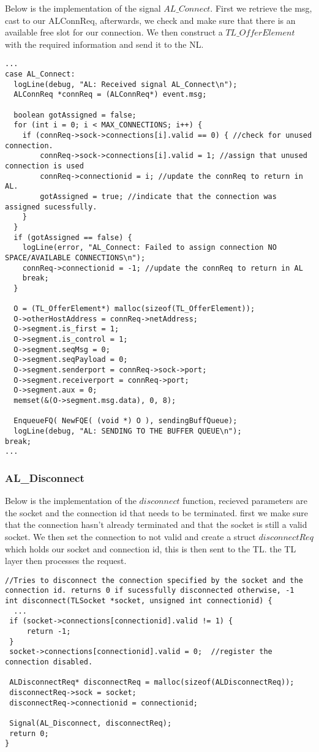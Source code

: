 Below is the implementation of the signal $AL\_Connect$.
First we retrieve the msg, cast to our ALConnReq, afterwards, we check and make sure that
there is an available free slot for our connection.
We then construct a $TL\_OfferElement$ with the required information and send it to the NL.
\begin{lstlisting}
...
case AL_Connect:
  logLine(debug, "AL: Received signal AL_Connect\n");
  ALConnReq *connReq = (ALConnReq*) event.msg;

  boolean gotAssigned = false;
  for (int i = 0; i < MAX_CONNECTIONS; i++) {
    if (connReq->sock->connections[i].valid == 0) { //check for unused connection.
        connReq->sock->connections[i].valid = 1; //assign that unused connection is used
        connReq->connectionid = i; //update the connReq to return in AL.
        gotAssigned = true; //indicate that the connection was assigned sucessfully.
    }
  }
  if (gotAssigned == false) {
    logLine(error, "AL_Connect: Failed to assign connection NO SPACE/AVAILABLE CONNECTIONS\n");
    connReq->connectionid = -1; //update the connReq to return in AL
    break;
  }

  O = (TL_OfferElement*) malloc(sizeof(TL_OfferElement));
  O->otherHostAddress = connReq->netAddress;
  O->segment.is_first = 1;
  O->segment.is_control = 1;
  O->segment.seqMsg = 0;
  O->segment.seqPayload = 0;
  O->segment.senderport = connReq->sock->port;
  O->segment.receiverport = connReq->port;
  O->segment.aux = 0;
  memset(&(O->segment.msg.data), 0, 8);

  EnqueueFQ( NewFQE( (void *) O ), sendingBuffQueue);
  logLine(debug, "AL: SENDING TO THE BUFFER QUEUE\n");
break;
...
\end{lstlisting}



\subsubsection{AL\_Disconnect}

Below is the implementation of the $disconnect$ function, recieved parameters are the socket and the connection id that needs to be terminated.
first we make sure that the connection hasn't already terminated and that the socket is still a valid socket.
We then set the connection to not valid and create a struct $disconnectReq$ which holds our socket and connection id, this is then sent to the TL.
the TL layer then processes the request.
\begin{lstlisting}
//Tries to disconnect the connection specified by the socket and the connection id. returns 0 if sucessfully disconnected otherwise, -1
int disconnect(TLSocket *socket, unsigned int connectionid) {
  ...
 if (socket->connections[connectionid].valid != 1) {
     return -1;
 }
 socket->connections[connectionid].valid = 0;  //register the connection disabled.

 ALDisconnectReq* disconnectReq = malloc(sizeof(ALDisconnectReq));
 disconnectReq->sock = socket;
 disconnectReq->connectionid = connectionid;

 Signal(AL_Disconnect, disconnectReq);
 return 0;
}
\end{lstlisting}


